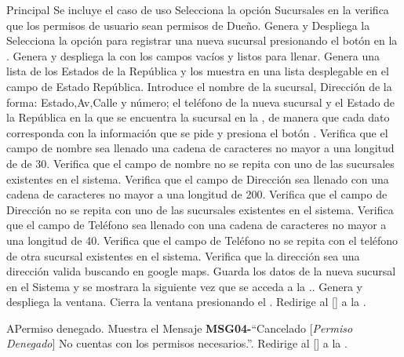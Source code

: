 	\begin{UCtrayectoria}{Principal}
		\UCpaso Se incluye el caso de uso 
		\UCpaso[\UCactor] Selecciona la opción Sucursales en la  
		\UCpaso verifica que los permisos de usuario sean permisos de Dueño. 
		\UCpaso Genera y Despliega la 
		\UCpaso[\UCactor] Selecciona la opción para registrar una nueva sucursal presionando el botón  en la .
		\UCpaso Genera y despliega la  con los campos vacíos y listos para llenar. 
		\UCpaso Genera una lista de los Estados de la República y los muestra en una lista desplegable en el campo de Estado República. 
		\UCpaso[\UCactor] Introduce el nombre de la sucursal, Dirección de la forma: Estado,Av,Calle y número; el teléfono de la nueva sucursal y el Estado de la República en la que se encuentra la sucursal en la , de manera que cada dato corresponda con la información que se pide y presiona el  botón  .   
		\UCpaso Verifica que el campo de nombre sea llenado una cadena de caracteres no mayor a una longitud de de 30. 
		\UCpaso Verifica que el campo de nombre no se repita con uno de las sucursales existentes en el sistema. 
		\UCpaso Verifica que el campo de Dirección sea llenado con una cadena de caracteres no mayor a una longitud de 200. 
		\UCpaso Verifica que el campo de Dirección no se repita con uno de las sucursales existentes en el sistema. 
		\UCpaso Verifica que el campo de Teléfono sea llenado con una cadena de caracteres no mayor a  una longitud de 40. 
		\UCpaso Verifica que el campo de Teléfono no se repita con el teléfono de otra sucursal existentes en el sistema. 
		\UCpaso Verifica que la dirección sea una dirección valida buscando en google maps.  
		\UCpaso Guarda los datos de la nueva sucursal en el Sistema y se mostrara la siguiente vez que se acceda a la ..  
		\UCpaso Genera y despliega la ventana.  
		\UCpaso [\UCactor] Cierra la ventana presionando el .
		\UCpaso Redirige al [\UCactor] a la  .
	\end{UCtrayectoria}




\begin{UCtrayectoriaA}{A}{Permiso denegado.}
			\UCpaso Muestra el Mensaje {\bf MSG04-}``Cancelado [{\em Permiso Denegado}] No cuentas con los permisos necesarios.''.
			\UCpaso Redirige al [\UCactor] a la  .
		\end{UCtrayectoriaA}

